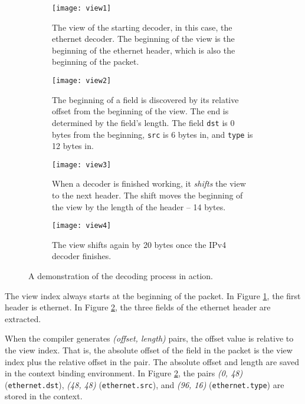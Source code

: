 \begin{figure}[ht]
\begin{subfigure}[t]{.45\textwidth}
  \centering
  \texttt{[image: view1]}
  \caption{The view of the starting decoder, in this case, the ethernet
decoder. The beginning of the view is the beginning of the ethernet
header, which is also the beginning of the packet.}
  \label{fg:view1}
\end{subfigure}%
\hfill
\begin{subfigure}[t]{.45\textwidth}
  \centering
  \texttt{[image: view2]}
  \caption{The beginning of a field is discovered by its relative offset from
the beginning of the view. The end is determined by the field's length. The
field \texttt{dst} is 0 bytes from the beginning, \texttt{src} is 6 bytes in,
and \texttt{type} is 12 bytes in.}
  \label{fg:view2}
\end{subfigure}

\begin{subfigure}[t]{.45\textwidth}
  \centering
  \texttt{[image: view3]}
  \caption{When a decoder is finished working, it \textit{shifts} the view to
the next header. The shift moves the beginning of the view by the length of the
header -- 14 bytes.}
  \label{fg:view3}
\end{subfigure}%
\hfill
\begin{subfigure}[t]{.45\textwidth}
  \centering
  \texttt{[image: view4]}
  \caption{The view shifts again by 20 bytes once the IPv4 decoder finishes.}
  \label{fg:view4}
\end{subfigure}
\caption{A demonstration of the decoding process in action.}
\label{fg:decoding}
\end{figure}

 
The view index always starts at the beginning of the packet.
In Figure \ref{fg:view1}, the first header is ethernet.
In Figure \ref{fg:view2}, the three fields of the ethernet header
are extracted.

When the compiler generates \textit{(offset, length)} pairs,
the offset value is relative to the view index. That is, the
absolute offset of the field in the packet is the view index plus 
the relative offset in the pair.
The absolute offset and length are saved in the context binding environment.
In Figure \ref{fg:view2}, the pairs \textit{(0, 48)} (\texttt{ethernet.dst}),
\textit{(48, 48)} (\texttt{ethernet.src}), and \textit{(96, 16)} 
(\texttt{ethernet.type}) are stored in the context.

